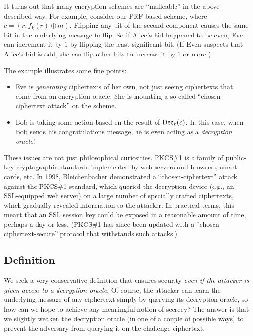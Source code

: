 \documentclass[11pt]{article}
\begin{document}
It turns out that many encryption schemes are ``malleable'' in the
above-described way.  For example, consider our PRF-based scheme,
where $c = (r , f_{k}(r) \oplus m)$.  Flipping any bit of the second
component causes the same bit in the underlying message to flip.  So
if Alice's bid happened to be even, Eve can increment it by $1$ by
flipping the least significant bit.  (If Even suspects that Alice's
bid is odd, she can flip other bits to increase it by $1$ or more.)

The example illustrates some fine points:
\begin{itemize}
\item Eve is \emph{generating} ciphertexts of her own, not just seeing
  ciphertexts that come from an encryption oracle.  She is mounting a
  so-called ``chosen-ciphertext attack'' on the scheme.
\item Bob is taking some action based on the result of
  $\mathsf{Dec}_{k}(c)$.  In this case, when Bob sends his congratulations
  message, he is even acting as a \emph{decryption oracle}!
\end{itemize}

These issues are not just philosophical curiosities.  PKCS\#1 is a
family of public-key cryptographic standards implemented by web
servers and browsers, smart cards, etc.  In 1998, Bleichenbacher
demonstrated a ``chosen-ciphertext'' attack against the PKCS\#1
standard, which queried the decryption device (e.g., an SSL-equipped
web server) on a large number of specially crafted ciphertexts, which
gradually revealed information to the attacker.  In practical terms,
this meant that an SSL session key could be exposed in a reasonable
amount of time, perhaps a day or less.  (PKCS\#1 has since been
updated with a ``chosen ciphertext-secure'' protocol that withstands
such attacks.)

\subsection{Definition}
\label{sec:cca-definition}

We seek a very conservative definition that ensures security
\emph{even if the attacker is given access to a decryption oracle}.
Of course, the attacker can learn the underlying message of any
ciphertext simply by querying its decryption oracle, so how can we
hope to achieve any meaningful notion of secrecy?  The answer is that
we slightly weaken the decryption oracle (in one of a couple of
possible ways) to prevent the adversary from querying it on the
challenge ciphertext.
\end{document}

